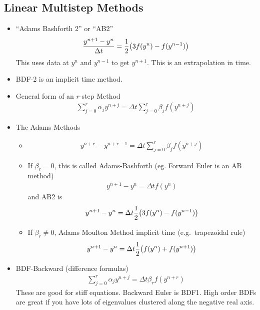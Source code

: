 \documentclass{article}
\newcommand{\Dt}{\Delta t}
\begin{document}
        \subsection{Linear Multistep Methods}
            \begin{itemize}
                \item ``Adams Bashforth 2'' or ``AB2''
                \begin{align*}
                    \frac{y^{n+1} - y^n}{\Dt} = \frac{1}{2}\qty(3f(y^n) - f(y^{n-1}))
                \end{align*}
                This uses data at $y^n$ and $y^{n-1}$ to get $y^{n+1}$.  This is an extrapolation in time.
                \item BDF-2 is an implicit time method.
                \item General form of an $r$-step Method
                \begin{align*}
                    \sum_{j=0}^r\alpha_jy^{n+j} = \Dt\sum_{j=0}^r\beta_jf(y^{n+j})
                \end{align*}
                \item The Adams Methods
                \begin{itemize}
                    \item \begin{align}
                        y^{n+r} - y^{n+r-1} = \Dt\sum_{j=0}^r\beta_jf(y^{n+j})
                    \end{align}
                    \item If $\beta_r = 0$, this is called Adams-Bashforth (eg. Forward Euler is an AB method)
                    \begin{align}
                        y^{n+1} - y^n = \Dt f(y^n)
                    \end{align}
                    and AB2 is
                    \begin{align}
                        y^{n+1} - y^n = \Dt\frac{1}{2}\qty(3f(y^n) - f(y^{n-1}))
                    \end{align}
                    \item If $\beta_r \neq 0$, Adams Moulton Method implicit time (e.g.~trapezoidal rule)
                    \begin{align}
                        y^{n+1} - y^n = \Dt\frac{1}{2}\qty(f(y^n) + f(y^{n+1}))
                    \end{align}
                \end{itemize}
                \item BDF-Backward (difference formulas)
                \begin{align}
                    \sum_{j=0}^r\alpha_jy^{n+j} = \Dt\beta_rf(y^{n+r})
                \end{align}
                These are good for stiff equations.  Backward Euler is BDF1.  High order BDFs are great if you have lots of eigenvalues clustered along the negative real axis.
            \end{itemize}
\end{document}
